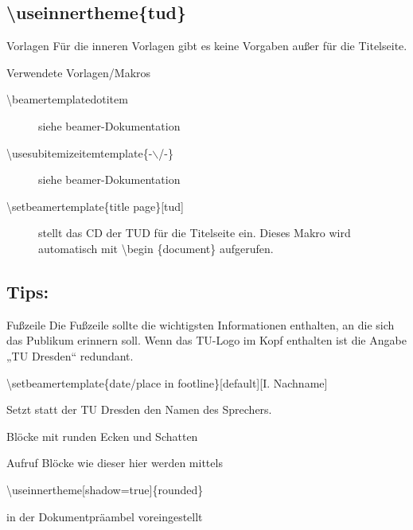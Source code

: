 \documentclass[presentation,t]{beamer}
\begin{document}
\subsection{\textbackslash useinnertheme\{tud\}}
\label{sec-2-6}

\begin{frame}[label=sec-2-6-1]{Vorlagen}
Für die inneren Vorlagen gibt es keine Vorgaben außer für die
Titelseite.
\begin{block}{Verwendete Vorlagen/Makros}
\begin{description}
\item[{\textbackslash beamertemplatedotitem}] siehe beamer-Dokumentation
\item[{\textbackslash usesubitemizeitemtemplate\{-$\backslash$/-\}}] siehe
beamer-Dokumentation
\item[{\textbackslash setbeamertemplate\{title page\}[tud]}] stellt das CD
der TUD für die Titelseite ein. Dieses Makro wird automatisch mit
\textbackslash begin \{document\} aufgerufen.
\end{description}
\end{block}
\end{frame}

\subsection{Tips:}
\label{sec-2-7}
\begin{frame}[label=sec-2-7-1]{Fußzeile}
Die Fußzeile sollte die wichtigsten Informationen enthalten, an die
sich das Publikum erinnern soll. Wenn das TU-Logo im Kopf enthalten
ist die Angabe „TU Dresden“ redundant.

\textbackslash setbeamertemplate\{date/place in
footline\}[default][I. Nachname] 

Setzt statt der TU Dresden den Namen
des Sprechers.
\end{frame}
\begin{frame}[label=sec-2-7-2]{Blöcke mit runden Ecken und Schatten}
\begin{block}{Aufruf}
Blöcke wie dieser hier werden mittels 

\textbackslash useinnertheme[shadow=true]\{rounded\}

in der Dokumentpräambel voreingestellt
\end{block}
\end{frame}
\end{document}
